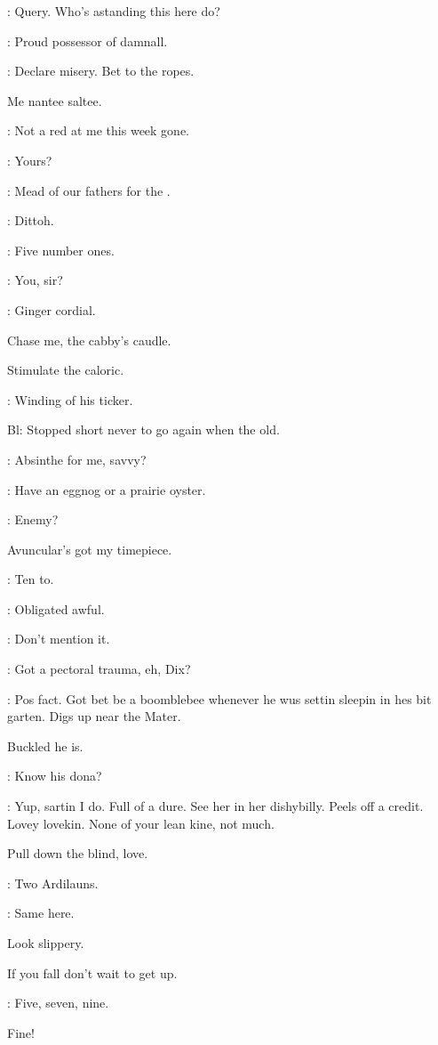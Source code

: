 
\lenehan: Query. Who's astanding this here do?

\madden: Proud possessor of damnall.

\lynch: Declare misery. Bet to the ropes.

Me nantee saltee.

\dixon: Not a red at me this week gone.

\barman: Yours?

\stephen: Mead of our fathers for the .

\bannon: Dittoh.

\stephen: Five number ones.

\barman: You, sir?

\Bloom: Ginger cordial.

Chase me, the cabby's caudle.

Stimulate the caloric.

: Winding of his ticker.

Bl: Stopped short never to go again when the old.

\stephen: Absinthe for me, savvy?

\mulligan:  Have an eggnog or a prairie oyster.

\Bloom: Enemy?

Avuncular's got my timepiece.

\madden: Ten to.

\Bloom: Obligated awful.

\madden: Don't mention it.

\lynch: Got a pectoral trauma, eh, Dix?

\dixon: Pos fact. Got bet be a boomblebee whenever he wus
settin sleepin in hes bit garten.
Digs up near the Mater.

Buckled he is.

\mulligan: Know his dona?

\dixon: Yup, sartin I do. Full of a dure. See her in her dishybilly.
Peels off a credit. Lovey lovekin. None of your lean kine, not much.

Pull down the blind, love.

\madden: Two Ardilauns.

\lynch: Same here.

Look slippery.

If you fall don't wait to get up.

\barman: Five, seven, nine.

Fine!

